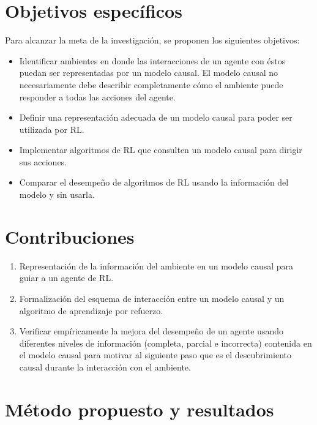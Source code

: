 \section{Objetivos específicos}

Para alcanzar la meta de la investigación, se proponen
los siguientes objetivos:

\begin{itemize}
    \item Identificar ambientes en donde 
    las interacciones de un agente con éstos puedan ser representadas por un modelo causal.
    El modelo causal no necesariamente debe
    describir completamente cómo el ambiente puede responder a todas las acciones del agente.
    \item Definir una representación adecuada
    de un modelo causal para poder ser utilizada 
    por RL.
    \item Implementar algoritmos de RL que consulten un modelo causal para dirigir sus acciones.
    \item Comparar el desempeño de algoritmos
    de RL usando la información del modelo y 
    sin usarla. 
\end{itemize}


\section{Contribuciones}


\begin{enumerate}
    \item Representación de la información del ambiente
    en un modelo causal para guiar a un agente de RL.
    \item 
    Formalización del esquema 
    de interacción entre
    un modelo causal y un algoritmo de aprendizaje por
    refuerzo.
    \item  Verificar empíricamente
    la mejora del desempeño de un agente usando diferentes niveles de información (completa, parcial e incorrecta) contenida en el modelo causal para motivar al siguiente paso 
    que es el descubrimiento causal durante la interacción con el
    ambiente.
\end{enumerate}

\section{Método propuesto y resultados}

